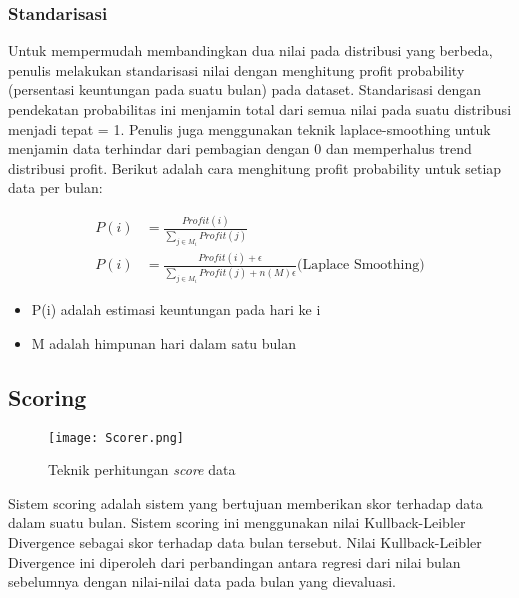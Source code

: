 \documentclass{article}
\begin{document}
\subsubsection{Standarisasi}

\begin{adjustwidth}{4em}{0pt}
	
	\hspace{\parindent}Untuk mempermudah membandingkan dua nilai pada distribusi yang berbeda, penulis melakukan standarisasi nilai dengan menghitung profit probability (persentasi keuntungan pada suatu bulan) pada dataset. Standarisasi dengan pendekatan probabilitas ini menjamin total dari semua nilai pada suatu distribusi menjadi tepat = 1. Penulis juga menggunakan teknik laplace-smoothing untuk menjamin data terhindar dari pembagian dengan 0 dan memperhalus trend distribusi profit. Berikut adalah cara menghitung profit probability untuk setiap data per bulan:
	
	\begin{align*}
	P(i) &= \frac{Profit(i)} {\sum\limits_{j \in M_i} Profit(j)}\\
	P(i) &= \frac{Profit(i)+\epsilon}{\sum\limits_{j \in M_i} Profit(j)+n(M)\epsilon} \text{(Laplace Smoothing)}
	\end{align*}
	
	\begin{itemize}
		\setlength{\itemindent}{1cm}
		\item{P(i) adalah estimasi keuntungan pada hari ke i}
		\item{M adalah himpunan hari dalam satu bulan}
	\end{itemize}
	
\end{adjustwidth}

\subsection{Scoring}

\begin{adjustwidth}{2em}{0pt}
	
	\begin{figure}[H]
		\centering
		\texttt{[image: Scorer.png]}
		\caption{Teknik perhitungan \textit{score} data}
	\end{figure}
	
	\hspace{\parindent}Sistem scoring adalah sistem yang bertujuan memberikan skor terhadap data dalam suatu bulan. Sistem scoring ini menggunakan nilai Kullback-Leibler Divergence sebagai skor terhadap data bulan tersebut. Nilai Kullback-Leibler Divergence ini diperoleh dari perbandingan antara regresi dari nilai bulan sebelumnya dengan nilai-nilai data pada bulan yang dievaluasi.
	
\end{adjustwidth}
\end{document}
